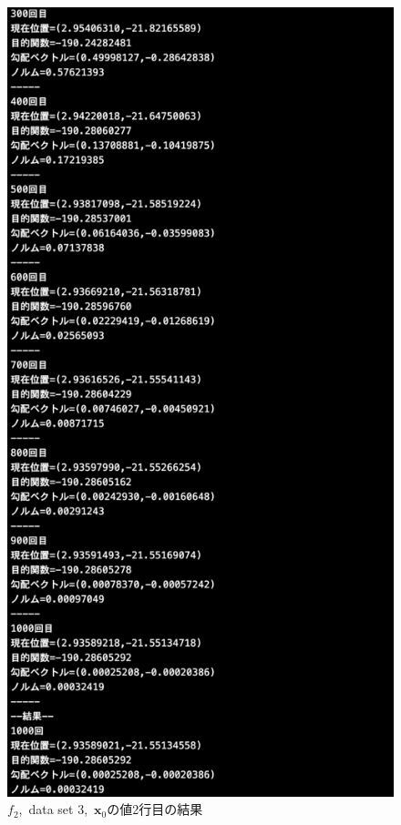\documentclass[12pt]{jarticle}
\begin{document}
\begin{figure}[h]
\begin{minipage}{0.5\hsize}
    \end{minipage}
    \begin{minipage}{0.5\hsize}
        \begin{center}
            \includegraphics[scale=0.2]{kadai1_2s_out3_2_3.png}
        \end{center}
    \end{minipage}
    \caption{$f_2$,\ data set 3,\ $\boldsymbol{x}_0$の値2行目の結果}
\end{figure}
\end{document}
